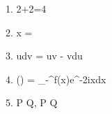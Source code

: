 1. 2+2=4

2. \displaystyle x = 

3. \int udv = uv - \int vdu

4. (\xi) = \int_{-\infty}^\infty f(x)e^{-2\pi ix\xi}dx

5. P \rightarrow Q, P \vdash Q

